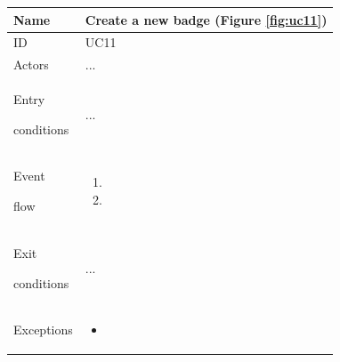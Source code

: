 \begin{center}
    \def\arraystretch{1.5}
    \begin{tabular}{| m{2cm} | m{10cm}|}
        \hline
        Name                  & Create a new badge  (Figure \ref{fig:uc11}) \\ \hline
        ID                    & UC11                                        \\ \hline
        Actors                & ...                                         \\ \hline
        Entry \par conditions & ...                                         \\ \hline
        Event \par flow       & \begin{enumerate}
                                    \item
                                    \item
                                \end{enumerate}                            \\ \hline
        Exit \par conditions  & ...                                         \\ \hline
        Exceptions            & \begin{itemize}
                                    \item
                                \end{itemize}                              \\ \hline
    \end{tabular}
\end{center}

